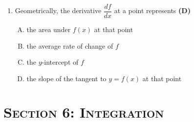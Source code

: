 \documentclass[10pt,a4paper]{article}
\newcommand{\topic}[1]{\section*{\large\textsc{#1}}}
\begin{document}
\begin{enumerate}[1.]
\item Geometrically, the derivative $\dfrac{df}{dx}$ at a point represents \hfill \textbf{(D)}
\begin{enumerate}[(A)]
    \item the area under $f(x)$ at that point
    \item the average rate of change of $f$
    \item the $y$-intercept of $f$
    \item the slope of the tangent to $y = f(x)$ at that point
\end{enumerate}

\end{enumerate}

\newpage
\topic{Section 6: Integration}
\end{document}
